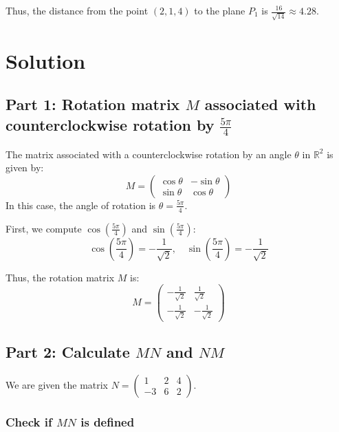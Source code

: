 \documentclass[11pt]{article}
\begin{document}
Thus, the distance from the point \( (2, 1, 4) \) to the plane \( P_1 \) is \( \frac{16}{\sqrt{14}} \approx 4.28 \).




\newpage

\section{Solution}

\subsection{Part 1: Rotation matrix \( M \) associated with counterclockwise rotation by \( \frac{5\pi}{4} \)}

The matrix associated with a counterclockwise rotation by an angle \( \theta \) in \( \mathbb{R}^2 \) is given by:
\[
M = \begin{pmatrix} \cos\theta & -\sin\theta \\ \sin\theta & \cos\theta \end{pmatrix}
\]
In this case, the angle of rotation is \( \theta = \frac{5\pi}{4} \).

First, we compute \( \cos\left( \frac{5\pi}{4} \right) \) and \( \sin\left( \frac{5\pi}{4} \right) \):
\[
\cos\left( \frac{5\pi}{4} \right) = -\frac{1}{\sqrt{2}}, \quad \sin\left( \frac{5\pi}{4} \right) = -\frac{1}{\sqrt{2}}
\]

Thus, the rotation matrix \( M \) is:
\[
M = \begin{pmatrix} -\frac{1}{\sqrt{2}} & \frac{1}{\sqrt{2}} \\ -\frac{1}{\sqrt{2}} & -\frac{1}{\sqrt{2}} \end{pmatrix}
\]

\newpage

\subsection{Part 2: Calculate \( MN \) and \( NM \)}

We are given the matrix \( N = \begin{pmatrix} 1 & 2 & 4 \\ -3 & 6 & 2 \end{pmatrix} \).

\subsubsection*{Check if \( MN \) is defined}
\end{document}
